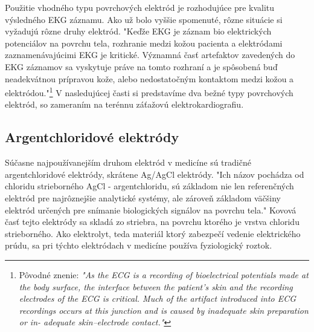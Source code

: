 Použitie vhodného typu povrchových elektród je rozhodujúce pre kvalitu výsledného EKG záznamu. Ako už bolo vyššie spomenuté, rôzne situácie si vyžadujú rôzne druhy elektród. "Keďže EKG je záznam bio elektrických potenciálov na povrchu tela, rozhranie medzi kožou pacienta a elektródami zaznamenávajúcimi EKG je kritické. Významná časť artefaktov zavedených do EKG záznamov sa vyskytuje práve na tomto rozhraní a je spôsobená buď neadekvátnou prípravou kože, alebo nedostatočným kontaktom medzi kožou a elektródou."\footnote{Pôvodné znenie: \textit{"As the ECG is a recording of bioelectrical potentials made at the body surface, the interface between the patient’s skin and the recording electrodes of the ECG is critical. Much of the artifact introduced into ECG recordings occurs at this junction and is caused by inadequate skin preparation or in- adequate skin–electrode contact."}}\cite{Garvey2006} V nasledujúcej časti si predstavíme dva bežné typy povrchových elektród, so zameraním na terénnu záťažovú elektrokardiografiu.

\subsection{Argentchloridové elektródy}

Súčasne najpoužívanejším druhom elektród v medicíne sú tradičné argentchloridové elektródy, skrátene Ag/AgCl elektródy. "Ich názov pochádza od chloridu strieborného AgCl - argentchloridu, sú základom nie len referenčných elektród pre najrôznejšie analytické systémy, ale zároveň základom väčšiny elektród určených pre snímanie biologických signálov na povrchu tela."\cite{Roubík2007} Kovová časť tejto elektródy sa skladá zo striebra, na povrchu ktorého je vrstva chloridu strieborného. Ako elektrolyt, teda materiál ktorý zabezpečí vedenie elektrického prúdu, sa pri týchto elektródach v medicíne používa fyziologický roztok.\cite{Roubík2007}

